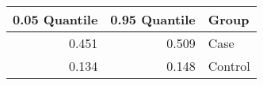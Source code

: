 \begin{table}[ht]
\centering
\begin{tabular}{rrl}
  \hline
0.05 Quantile & 0.95 Quantile & Group \\ 
  \hline
0.451 & 0.509 & Case \\ 
  0.134 & 0.148 & Control \\ 
   \hline
\end{tabular}
\end{table}
